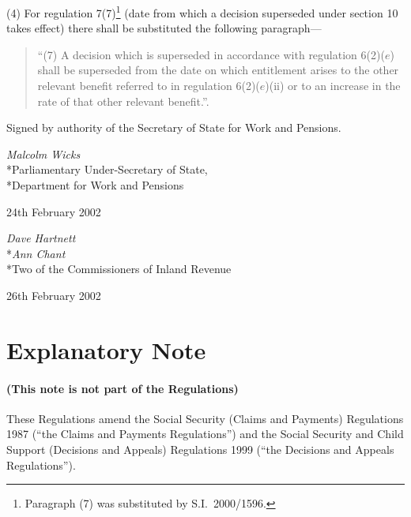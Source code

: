 \documentclass[12pt,a4paper]{article}
\begin{document}
(4) For regulation 7(7)\footnote{Paragraph (7) was substituted by S.I.\ 2000/1596.} (date from which a decision superseded under section 10 takes effect) there shall be substituted the following paragraph—
\begin{quotation}
“(7) A decision which is superseded in accordance with regulation 6(2)($e$)  shall be superseded from the date on which entitlement arises to the other relevant benefit referred to in regulation 6(2)($e$)(ii) or to an increase in the rate of that other relevant benefit.”.
\end{quotation}

\bigskip

 Signed 
by authority of the Secretary of State for Work and Pensions. 

{\raggedleft
\emph{Malcolm Wicks}\\*Parliamentary Under-Secretary of State,\\*Department for Work and Pensions

}


24th February 2002

\bigskip


{\raggedleft
\emph{Dave Hartnett}\\*\emph{Ann Chant}\\*Two of the Commissioners of Inland Revenue

}


26th February 2002


\small

\part{Explanatory Note}

\renewcommand\parthead{— Explanatory Note}

\subsection*{(This note is not part of the Regulations)}

These Regulations amend the Social Security (Claims and Payments) Regulations 1987 (“the Claims and Payments Regulations”) and the Social Security and Child Support (Decisions and Appeals) Regulations 1999 (“the Decisions and Appeals Regulations”).
\end{document}
